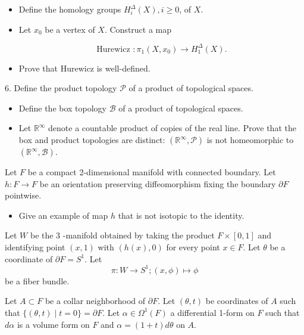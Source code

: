 \documentclass[14pt]{extarticle}
\begin{document}
\begin{itemize}
  \item Define the homology groups $H_{i}^{\Delta}(X), i \geq 0$, of $X$.

  \item {Let $x_{0}$ be a vertex of $X$. Construct a map

  $$
  \text { Hurewicz }: \pi_{1}\left(X, x_{0}\right) \rightarrow H_{1}^{\Delta}(X) \text {. }
  $$}
  \item Prove that Hurewicz is well-defined.
\end{itemize}
\newpage
6. Define the product topology $\mathcal{P}$ of a product of topological spaces.
\begin{itemize}
  \item Define the box topology $\mathcal{B}$ of a product of topological spaces.
  \item Let $\mathbb{R}^{\infty}$ denote a countable product of copies of the real line. Prove that the box and product topologies are distinct: $\left(\mathbb{R}^{\infty}, \mathcal{P}\right)$ is not homeomorphic to $\left(\mathbb{R}^{\infty}, \mathcal{B}\right)$.
\end{itemize}
\newpage
Let $F$ be a compact 2-dimensional manifold with connected boundary. Let $h: F \rightarrow F$ be an orientation preserving diffeomorphism fixing the boundary $\partial F$ pointwise.

\begin{itemize}
  \item Give an example of map $h$ that is not isotopic to the identity.
\end{itemize}

Let $W$ be the 3 -manifold obtained by taking the product $F \times[0,1]$ and identifying point $(x, 1)$ with $(h(x), 0)$ for every point $x \in F$. Let $\theta$ be a coordinate of $\partial F=S^{1}$. Let
$$
\pi: W \rightarrow S^{1} ;(x, \phi) \mapsto \phi
$$
be a fiber bundle.

Let $A \subset F$ be a collar neighborhood of $\partial F$. Let $(\theta, t)$ be coordinates of $A$ such that $\{(\theta, t) \mid t=0\}=\partial F$. Let $\alpha \in \Omega^{1}(F)$ a differential 1-form on $F$ such that $d \alpha$ is a volume form on $F$ and $\alpha=(1+t) d \theta$ on $A$.
\end{document}
